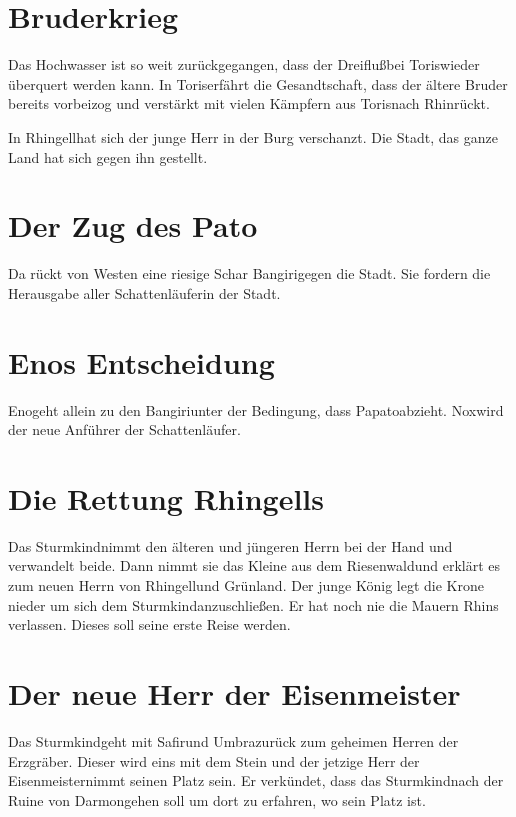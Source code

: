 \documentclass[12pt,a4paper,onecolumn,twoside,ngerman]{book}
\newcommand{\Sturmkind}{Sturmkind}
\newcommand{\Bangiri}{Bangiri}
\newcommand{\Pato}{Pato}
\newcommand{\Papato}{Papato}
\newcommand{\Schattenlaufer}{Schattenläufer}
\newcommand{\Eno}{Eno}
\newcommand{\Nox}{Nox}
\newcommand{\Umbra}{Umbra}
\newcommand{\Rhingell}{Rhingell}
\newcommand{\Rhin}{Rhin}
\newcommand{\Dreifluss}{Dreifluß}
\newcommand{\Toris}{Toris}
\newcommand{\Grunland}{Grünland}
\newcommand{\Darmon}{Darmon}
\newcommand{\Riesenwald}{Riesenwald}
\newcommand{\Eisenmeister}{Eisenmeister}
\newcommand{\Safir}{Safir}
\begin{document}

\section{Bruderkrieg}
Das Hochwasser ist so weit zurückgegangen, dass der \Dreifluss bei \Toris wieder überquert werden kann. In \Toris erfährt die Gesandtschaft, dass der ältere Bruder bereits vorbeizog und verstärkt mit vielen Kämpfern aus \Toris nach \Rhin rückt. 

In \Rhingell hat sich der junge Herr in der Burg verschanzt. Die Stadt, das ganze Land hat sich gegen ihn gestellt. 

\section{Der Zug des \Pato}
Da rückt von Westen eine riesige Schar \Bangiri gegen die Stadt. Sie fordern die Herausgabe aller \Schattenlaufer in der Stadt.

\section{{\Eno}s Entscheidung}
\Eno geht allein zu den \Bangiri unter der Bedingung, dass \Papato abzieht. \Nox wird der neue Anführer der Schattenläufer.

\section{Die Rettung \Rhingell{s}}
Das \Sturmkind nimmt den älteren und jüngeren Herrn bei der Hand und verwandelt beide. Dann nimmt sie das Kleine aus dem \Riesenwald und erklärt es zum neuen Herrn von \Rhingell und \Grunland. Der junge König legt die Krone nieder um sich dem \Sturmkind anzuschließen. Er hat noch nie die Mauern \Rhin{s} verlassen. Dieses soll seine erste Reise werden.

\section{Der neue Herr der \Eisenmeister}
Das \Sturmkind geht mit \Safir und \Umbra zurück zum geheimen Herren der Erzgräber. Dieser wird eins mit dem Stein und der jetzige Herr der \Eisenmeister nimmt seinen Platz sein. Er verkündet, dass das \Sturmkind nach der Ruine von \Darmon gehen soll um dort zu erfahren, wo sein Platz ist.
\end{document}
